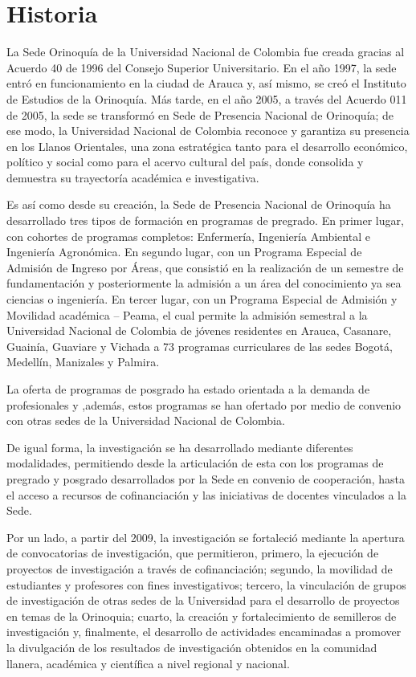 \documentclass[
]{book}
\begin{document}
\hypertarget{hist}{%
\section*{Historia}\label{hist}}

La Sede Orinoquía de la Universidad Nacional de Colombia fue creada gracias al Acuerdo 40 de 1996 del Consejo Superior Universitario. En el año 1997, la sede entró en funcionamiento en la ciudad de Arauca y, así mismo, se creó el Instituto de Estudios de la Orinoquía. Más tarde, en el año 2005, a través del Acuerdo 011 de 2005, la sede se transformó en Sede de Presencia Nacional de Orinoquía; de ese modo, la Universidad Nacional de Colombia reconoce y garantiza su presencia en los Llanos Orientales, una zona estratégica tanto para el desarrollo económico, político y social como para el acervo cultural del país, donde consolida y demuestra su trayectoría académica e investigativa.

Es así como desde su creación, la Sede de Presencia Nacional de Orinoquía ha desarrollado tres tipos de formación en programas de pregrado. En primer lugar, con cohortes de programas completos: Enfermería, Ingeniería Ambiental e Ingeniería Agronómica. En segundo lugar, con un Programa Especial de Admisión de Ingreso por Áreas, que consistió en la realización de un semestre de fundamentación y posteriormente la admisión a un área del conocimiento ya sea ciencias o ingeniería. En tercer lugar, con un Programa Especial de Admisión y Movilidad académica -- Peama, el cual permite la admisión semestral a la Universidad Nacional de Colombia de jóvenes residentes en Arauca, Casanare, Guainía, Guaviare y Vichada a 73 programas curriculares de las sedes Bogotá, Medellín, Manizales y Palmira.

La oferta de programas de posgrado ha estado orientada a la demanda de profesionales y ,además, estos programas se han ofertado por medio de convenio con otras sedes de la Universidad Nacional de Colombia.

De igual forma, la investigación se ha desarrollado mediante diferentes modalidades, permitiendo desde la articulación de esta con los programas de pregrado y posgrado desarrollados por la Sede en convenio de cooperación, hasta el acceso a recursos de cofinanciación y las iniciativas de docentes vinculados a la Sede.

Por un lado, a partir del 2009, la investigación se fortaleció mediante la apertura de convocatorias de investigación, que permitieron, primero, la ejecución de proyectos de investigación a través de cofinanciación; segundo, la movilidad de estudiantes y profesores con fines investigativos; tercero, la vinculación de grupos de investigación de otras sedes de la Universidad para el desarrollo de proyectos en temas de la Orinoquia; cuarto, la creación y fortalecimiento de semilleros de investigación y, finalmente, el desarrollo de actividades encaminadas a promover la divulgación de los resultados de investigación obtenidos en la comunidad llanera, académica y científica a nivel regional y nacional.
\end{document}
